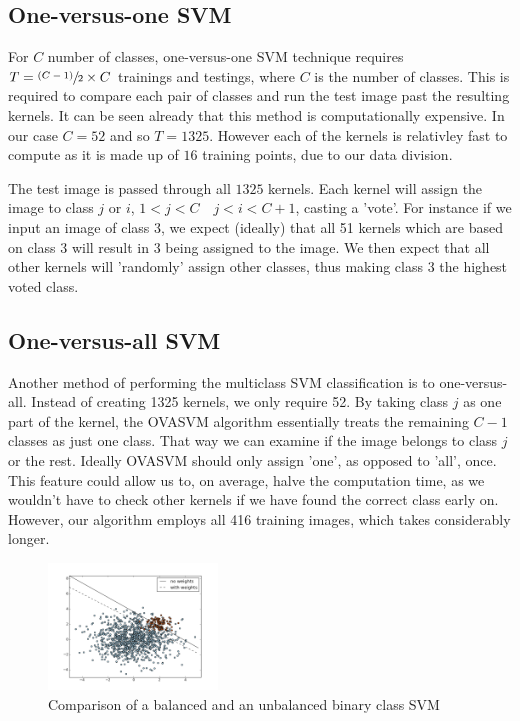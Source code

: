 \documentclass[10pt,twocolumn,letterpaper]{article}
\begin{document}
\subsection{One-versus-one SVM}
For $C$ number of classes, one-versus-one SVM technique requires $T = \sfrac{(C-1)}{2}\times C$ trainings and testings, where $C$ is the number of classes. This is required to compare each pair of classes and run the test image past the resulting kernels. It can be seen already that this method is computationally expensive. In our case $C=52$ and so $T = 1325$. However each of the kernels is relativley fast to compute as it is made up of $16$ training points, due to our data division.

The test image is passed through all $1325$ kernels. Each kernel will assign the image to class $j$ or $i$, $1<j<C \quad j<i<C+1$, casting a 'vote'. For instance if we input an image of class 3, we expect (ideally) that all 51 kernels which are based on class 3 will result  in $3$ being assigned to the image. We then expect that all other kernels will 'randomly' assign other classes, thus making class 3 the highest voted class.
 
\subsection{One-versus-all SVM}
Another method of performing the multiclass SVM classification is to one-versus-all. Instead of creating 1325 kernels, we only require 52. By taking class $j$ as one part of the kernel, the OVASVM algorithm essentially treats the remaining $C-1$ classes as just one class. That way we can examine if the image belongs to class $j$ or the rest. Ideally OVASVM should only assign 'one', as opposed to 'all', once. This feature could allow us to, on average, halve the computation time, as we wouldn't have to check other kernels if we have found the correct class early on. However, our algorithm employs all 416 training images, which takes considerably longer.

\begin{figure}[H]
\begin{center}
  
    \includegraphics[width=0.4\textwidth]{../results/svm_unbalanced}

  \caption{Comparison of a balanced and an unbalanced binary class SVM \cite{SVM_unb}} \label{fig:SVM_un}
\end{center}
\end{figure}
\end{document}
